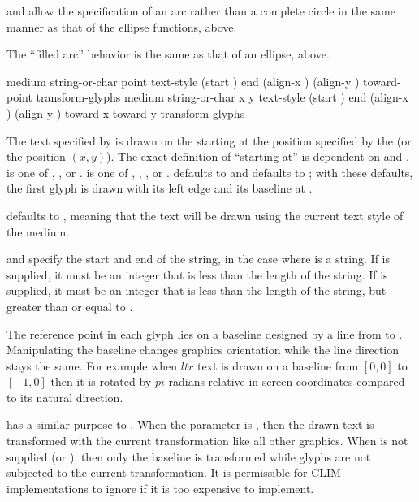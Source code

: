  and  allow the specification of an arc rather
than a complete circle in the same manner as that of the ellipse functions,
above.

The ``filled arc'' behavior is the same as that of an ellipse, above.


  {medium string-or-char point
                     \key text-style (start ) end
                          (align-x ) (align-y )
                          toward-point transform-glyphs
                     \DrawingOptions \TextOptions}
 {medium string-or-char x y
                     \key text-style (start ) end
                          (align-x ) (align-y )
                          toward-x toward-y transform-glyphs
                     \DrawingOptions \TextOptions}

The text specified by  is drawn on the 
 starting at the position specified by the  
(or the position $(x,y)$).  The exact definition of ``starting at'' is dependent
on  and .   is one of ,
, or .   is one of ,
, , or .   defaults to 
and  defaults to ; with these defaults, the first
glyph is drawn with its left edge and its baseline at .

 defaults to , meaning that the text will be drawn using
the current text style of the medium.

 and  specify the start and end of the string, in the case
where  is a string.  If  is supplied, it must be
an integer that is less than the length of the string.  If  is
supplied, it must be an integer that is less than the length of the string, but
greater than or equal to .

The reference point in each glyph lies on a baseline designed by a line from
 to . Manipulating the baseline changes graphics
orientation while the line direction stays the same. For example when $ltr$
text is drawn on a baseline from $[0, 0]$ to $[-1, 0]$ then it is rotated by
$pi$ radians relative in screen coordinates compared to its natural direction.

 has a similar purpose to . When the
parameter is , then the drawn text is transformed with the current
transformation like all other graphics. When  is not
supplied (or ), then only the baseline is transformed while glyphs
are not subjected to the current transformation. It is permissible for CLIM
implementations to ignore  if it is too expensive to
implement.

